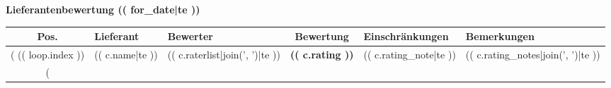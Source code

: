 \documentclass[a4paper,paper=landscape]{scrartcl}
\begin{document}
\sffamily

\begin{center}
\textbf{Lieferantenbewertung (( for_date|te ))}

{
\small
\begin{longtable}{|c|p{6cm}|p{4cm}|c|p{4cm}|p{6cm}|}
\hline
Pos. & Lieferant & Bewerter & Bewertung & Einschränkungen & Bemerkungen\\
\hline
(%
(( loop.index )) & (( c.name|te )) & (( c.raterlist|join(', ')|te )) & \cellcolor{(( c.rating ))}\textbf{(( c.rating ))} & \cellcolor{restrict}(( c.rating_note|te )) & (( c.rating_notes|join(', ')|te ))\\
\hline
(%
\end{longtable}
}

\end{center}
\end{document}
